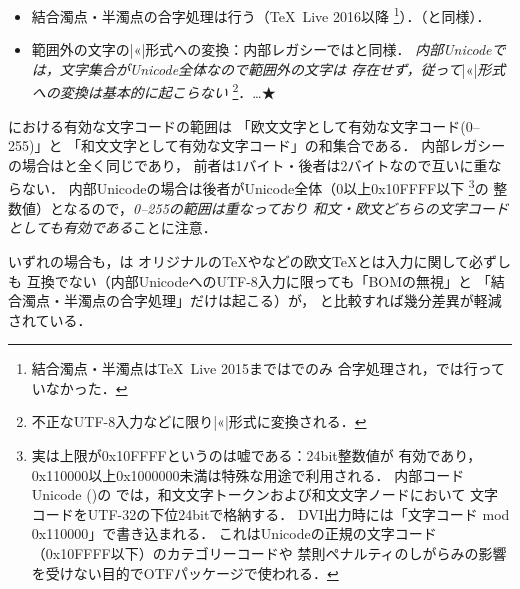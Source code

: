 \documentclass[a4paper,11pt,nomag,dvipdfmx]{jsarticle}
\begin{document}
\begin{itemize}
\begin{itemize}
 \item 結合濁点・半濁点の合字処理は行う（\TeX~Live 2016以降
  \footnote{結合濁点・半濁点は\TeX~Live 2015までは\pTeX でのみ
  合字処理され，\upTeX では行っていなかった．}）．（\pTeX と同様）．
 \item 範囲外の文字の|^^ab|形式への変換：内部レガシーでは\pTeX と同様．
  \emph{内部Unicodeでは，文字集合がUnicode全体なので範囲外の文字は
  存在せず，従って}|^^ab|\emph{形式への変換は基本的に起こらない}
  \footnote{不正なUTF-8入力などに限り|^^ab|形式に変換される．}．…★
\end{itemize}
%
\end{itemize}

\upTeX における有効な文字コードの範囲は
「欧文文字として有効な文字コード(0--255)」と
「和文文字として有効な文字コード」の和集合である．
内部レガシーの場合は\pTeX と全く同じであり，
前者は1バイト・後者は2バイトなので互いに重ならない．
内部Unicodeの場合は後者がUnicode全体（0以上0x10FFFF以下
\footnote{実は上限が0x10FFFFというのは嘘である：24bit整数値が
有効であり，0x110000以上0x1000000未満は特殊な用途で利用される．
内部コードUnicode ()の
\upTeX では，和文文字トークンおよび和文文字ノードにおいて
文字コードをUTF-32の下位24bitで格納する．
DVI出力時には「文字コード mod 0x110000」で書き込まれる．
これはUnicodeの正規の文字コード（0x10FFFF以下）のカテゴリーコードや
禁則ペナルティのしがらみの影響を受けない目的でOTFパッケージで使われる．}の
整数値）となるので，\emph{0--255の範囲は重なっており
和文・欧文どちらの文字コードとしても有効である}ことに注意．

いずれの場合も，\upTeX は
オリジナルの\TeX や\pdfTeX などの欧文\TeX とは入力に関して必ずしも
互換でない（内部UnicodeへのUTF-8入力に限っても「BOMの無視」と
「結合濁点・半濁点の合字処理」だけは起こる）が，
\pTeX と比較すれば幾分差異が軽減されている．
\end{document}
